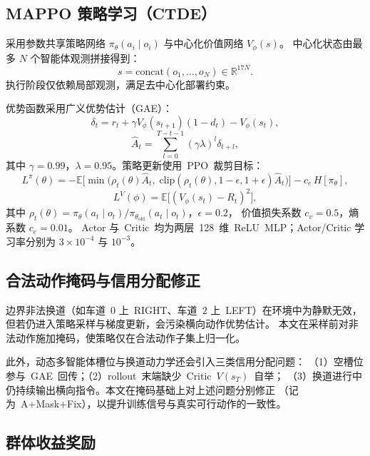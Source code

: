 \documentclass[UTF8,a4paper,11pt]{ctexart}
\begin{document}
\subsection{MAPPO 策略学习（CTDE）}
采用参数共享策略网络 $\pi_\theta(a_i\mid o_i)$ 与中心化价值网络 $V_\phi(s)$。
中心化状态由最多 $N$ 个智能体观测拼接得到：
\begin{equation}
  s = \mathrm{concat}(o_1,\ldots,o_N)\in\mathbb{R}^{17N}.
\end{equation}
执行阶段仅依赖局部观测，满足去中心化部署约束。

优势函数采用广义优势估计（GAE）\cite{schulman2016gae}：
\begin{equation}
  \delta_t = r_t + \gamma V_\phi(s_{t+1})(1-d_t) - V_\phi(s_t),
\end{equation}
\begin{equation}
  \hat{A}_t = \sum_{l=0}^{T-t-1}(\gamma\lambda)^l \delta_{t+l},
\end{equation}
其中 $\gamma=0.99$，$\lambda=0.95$。策略更新使用~PPO~裁剪目标\cite{schulman2017ppo}：
\begin{equation}
  L^{\pi}(\theta) = -\mathbb{E}\Big[
    \min\big(
      \rho_t(\theta)\hat{A}_t,\;
      \mathrm{clip}(\rho_t(\theta),1-\epsilon,1+\epsilon)\hat{A}_t
    \big)
  \Big] - c_e\, H[\pi_\theta],
\end{equation}
\begin{equation}
  L^{V}(\phi) = \mathbb{E}\big[(V_\phi(s_t)-R_t)^2\big],
\end{equation}
其中 $\rho_t(\theta)=\pi_\theta(a_t\mid o_t)/\pi_{\theta_{\mathrm{old}}}(a_t\mid o_t)$，$\epsilon=0.2$，
价值损失系数 $c_v=0.5$，熵系数 $c_e=0.01$。
Actor 与~Critic~均为两层~128~维~ReLU~MLP；Actor/Critic 学习率分别为 $3\times10^{-4}$ 与 $10^{-3}$。

\subsection{合法动作掩码与信用分配修正}
\label{sec:mask}
边界非法换道（如车道~$0$ 上~RIGHT、车道~$2$ 上~LEFT）在环境中为静默无效，
但若仍进入策略采样与梯度更新，会污染横向动作优势估计。
本文在采样前对非法动作施加掩码，使策略仅在合法动作子集上归一化。

此外，动态多智能体槽位与换道动力学还会引入三类信用分配问题：
（1）空槽位参与~GAE~回传；（2）rollout~末端缺少~Critic~$V(s_T)$~自举；
（3）换道进行中仍持续输出横向指令。本文在掩码基础上对上述问题分别修正
（记为~A+Mask+Fix），以提升训练信号与真实可行动作的一致性。

\subsection{群体收益奖励}
\label{sec:reward}
\end{document}
